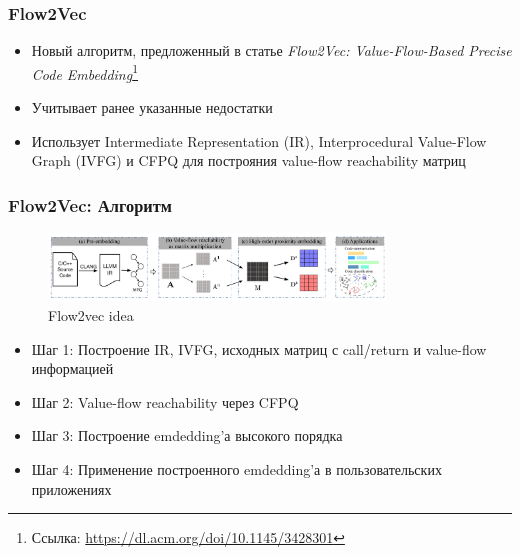 \documentclass[xcolor=table,english]{beamer}
\begin{document}
\begin{frame}[fragile] \frametitle{Flow2Vec}
    \begin{itemize}
            \item Новый алгоритм, предложенный в статье \textit{Flow2Vec: Value-Flow-Based Precise Code Embedding}\footnote{Ссылка: \href{https://dl.acm.org/doi/10.1145/3428301}{https://dl.acm.org/doi/10.1145/3428301}} 
            \item Учитывает ранее указанные недостатки
            \item Использует Intermediate Representation (IR), Interprocedural Value-Flow Graph (IVFG) и  CFPQ для построяния value-flow reachability матриц
        \end{itemize}
\end{frame}

\begin{frame}[fragile] \frametitle{Flow2Vec: Алгоритм}
    \begin{minipage}[m]{\linewidth}
        \begin{figure}
            \centering
            \includegraphics[width=0.8\textwidth]{figures/flow2vec_idea.png}
            \caption{Flow2vec idea}
            \label{fig:flow2vec_idea}
        \end{figure}
    \end{minipage}\hfill
    \begin{minipage}[m]{\linewidth}
        \begin{itemize}
            \item Шаг 1: Построение IR, IVFG, исходных матриц с call/return и value-flow информацией
            \item Шаг 2: Value-flow reachability через CFPQ
            \item Шаг 3: Построение emdedding'а высокого порядка
            \item Шаг 4: Применение построенного emdedding'а в пользовательских приложениях
        \end{itemize}
    \end{minipage}
\end{frame}
\end{document}

